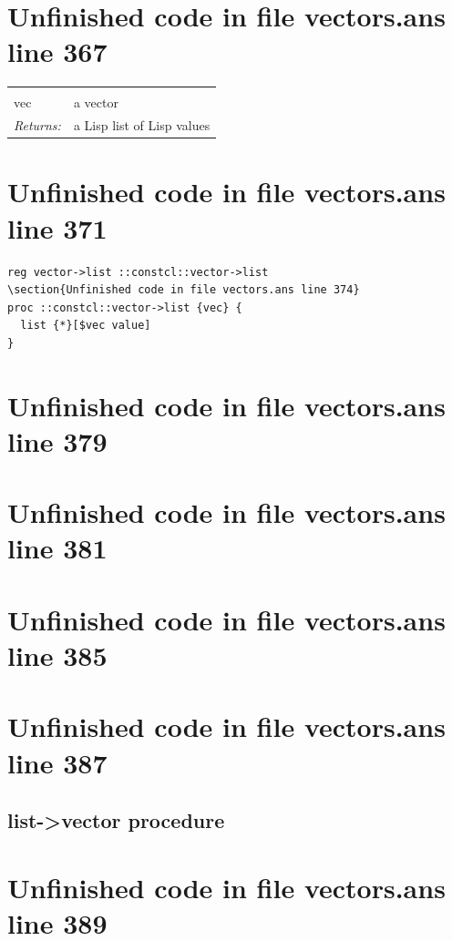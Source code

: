 \documentclass[twoside,9pt]{report}
\begin{document}
\section{Unfinished code in file vectors.ans line 367}
\noindent\begin{tabular}{ |p{1.9cm} p{8cm}| }
\hline
\rowcolor[HTML]{CCCCCC} \multicolumn{2}{|l|}{\bf vector->list (public)} \\
vec & a vector \\
\textit{Returns:} & a Lisp list of Lisp values \\
\hline
\end{tabular}
\section{Unfinished code in file vectors.ans line 371}
\begin{lstlisting}
reg vector->list ::constcl::vector->list
\section{Unfinished code in file vectors.ans line 374}
proc ::constcl::vector->list {vec} {
  list {*}[$vec value]
}
\end{lstlisting}
\section{Unfinished code in file vectors.ans line 379}
\section{Unfinished code in file vectors.ans line 381}
\section{Unfinished code in file vectors.ans line 385}
\section{Unfinished code in file vectors.ans line 387}
\subsection{list->vector procedure}
\label{list->vector-procedure}
\section{Unfinished code in file vectors.ans line 389}
\end{document}
